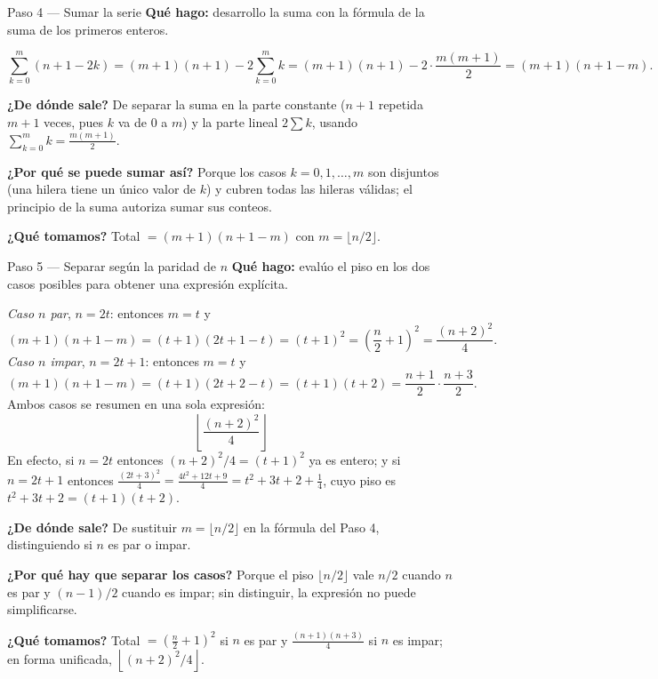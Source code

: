 \documentclass[11pt]{article}
\begin{document}
\begin{paso}{Paso 4 --- Sumar la serie}
\textbf{Qué hago:} desarrollo la suma con la fórmula de la suma de los primeros enteros.

\[
\sum_{k=0}^{m}(n+1-2k) = (m+1)(n+1) - 2\sum_{k=0}^{m}k = (m+1)(n+1) - 2\cdot\frac{m(m+1)}{2} = (m+1)(n+1-m).
\]

\textbf{¿De dónde sale?} De separar la suma en la parte constante ($n+1$ repetida $m+1$ veces, pues $k$ va de $0$ a $m$) y la parte lineal $2\sum k$, usando $\sum_{k=0}^{m}k = \frac{m(m+1)}{2}$.

\textbf{¿Por qué se puede sumar así?} Porque los casos $k=0,1,\dots,m$ son disjuntos (una hilera tiene un único valor de $k$) y cubren todas las hileras válidas; el principio de la suma autoriza sumar sus conteos.

\textbf{¿Qué tomamos?} Total $=(m+1)(n+1-m)$ con $m=\lfloor n/2\rfloor$.
\end{paso}

\begin{paso}{Paso 5 --- Separar según la paridad de $n$}
\textbf{Qué hago:} evalúo el piso en los dos casos posibles para obtener una expresión explícita.

\emph{Caso $n$ par}, $n=2t$: entonces $m=t$ y
\[
(m+1)(n+1-m) = (t+1)(2t+1-t) = (t+1)^{2} = \left(\frac{n}{2}+1\right)^{2} = \frac{(n+2)^2}{4}.
\]
\emph{Caso $n$ impar}, $n=2t+1$: entonces $m=t$ y
\[
(m+1)(n+1-m) = (t+1)(2t+2-t) = (t+1)(t+2) = \frac{n+1}{2}\cdot\frac{n+3}{2}.
\]
Ambos casos se resumen en una sola expresión:
\[
\boxed{\ \left\lfloor \frac{(n+2)^{2}}{4} \right\rfloor\ }
\]
En efecto, si $n=2t$ entonces $(n+2)^2/4=(t+1)^2$ ya es entero; y si $n=2t+1$ entonces $\frac{(2t+3)^2}{4} = \frac{4t^2+12t+9}{4} = t^2+3t+2+\frac{1}{4}$, cuyo piso es $t^2+3t+2 = (t+1)(t+2)$.

\textbf{¿De dónde sale?} De sustituir $m=\lfloor n/2\rfloor$ en la fórmula del Paso 4, distinguiendo si $n$ es par o impar.

\textbf{¿Por qué hay que separar los casos?} Porque el piso $\lfloor n/2\rfloor$ vale $n/2$ cuando $n$ es par y $(n-1)/2$ cuando es impar; sin distinguir, la expresión no puede simplificarse.

\textbf{¿Qué tomamos?} Total $=\left(\frac{n}{2}+1\right)^2$ si $n$ es par y $\frac{(n+1)(n+3)}{4}$ si $n$ es impar; en forma unificada, $\left\lfloor (n+2)^2/4\right\rfloor$.
\end{paso}
\end{document}
